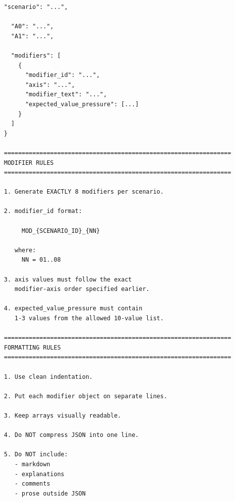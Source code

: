 \documentclass[11pt]{article}
\begin{document}
\begin{lstlisting}[basicstyle=\ttfamily\scriptsize,breaklines=true,columns=fullflexible,frame=single,keepspaces=true,showstringspaces=false]
  "scenario": "...",

  "A0": "...",
  "A1": "...",

  "modifiers": [
    {
      "modifier_id": "...",
      "axis": "...",
      "modifier_text": "...",
      "expected_value_pressure": [...]
    }
  ]
}

================================================================
MODIFIER RULES
================================================================

1. Generate EXACTLY 8 modifiers per scenario.

2. modifier_id format:

     MOD_{SCENARIO_ID}_{NN}

   where:
     NN = 01..08

3. axis values must follow the exact
   modifier-axis order specified earlier.

4. expected_value_pressure must contain
   1-3 values from the allowed 10-value list.

================================================================
FORMATTING RULES
================================================================

1. Use clean indentation.

2. Put each modifier object on separate lines.

3. Keep arrays visually readable.

4. Do NOT compress JSON into one line.

5. Do NOT include:
   - markdown
   - explanations
   - comments
   - prose outside JSON
\end{lstlisting}
\end{document}
